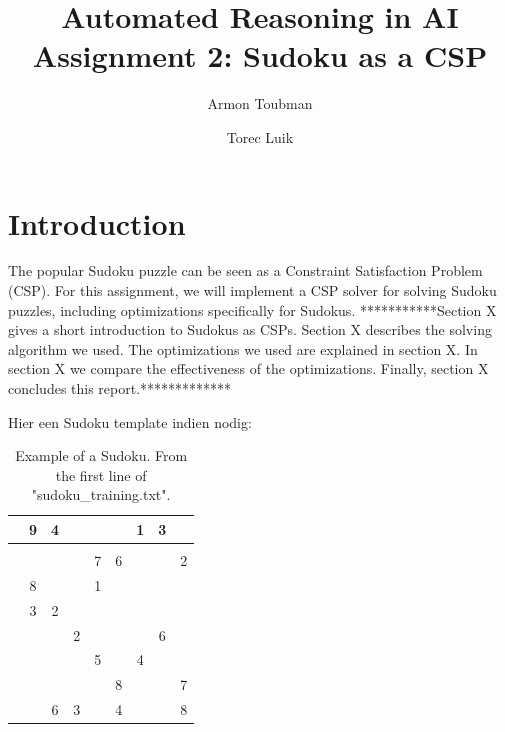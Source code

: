 \documentclass[11pt]{article} %
\title{Automated Reasoning in AI\\
Assignment 2: Sudoku as a CSP}
\author{Armon Toubman \and Torec Luik}
\begin{document}
\maketitle

\section{Introduction}

The popular Sudoku puzzle can be seen as a Constraint Satisfaction Problem (CSP). For this assignment, we will implement a CSP solver for solving Sudoku puzzles, including optimizations specifically for Sudokus. ***********Section X gives a short introduction to Sudokus as CSPs. Section X describes the solving algorithm we used. The optimizations we used are explained in section X. In section X we compare the effectiveness of the optimizations. Finally, section X concludes this report.*************%

Hier een Sudoku template indien nodig:
\begin{table}[htbp]

\caption{Example of a Sudoku. From the first line of "sudoku\_training.txt". }
    \label{fig:SudokuStart}

    \begin{center}
        \begin{tabular}{||c|c|c||c|c|c||c|c|c||}
        \hline
        \hline
         & 9 & 4 &  &  &  & 1 & 3 & \\
        \hline
         &  &  &  &  &  &  &  & \\
        \hline
         &  &  &  & 7 & 6 &  &  & 2\\
        \hline
        \hline
         & 8 &  &  & 1 &  &  &  & \\
        \hline
         & 3 & 2 &  &  &  &  &  & \\
        \hline
         &  &  & 2 &  &  &  & 6 & \\
        \hline
        \hline
         &  &  &  & 5 &  & 4 &  & \\
        \hline
         &  &  &  &  & 8 &  &  & 7\\
        \hline
         &  & 6 & 3 &  & 4 &  &  & 8\\
        \hline
        \hline
        \end{tabular}
    \end{center}
\end{table}
\end{document}
